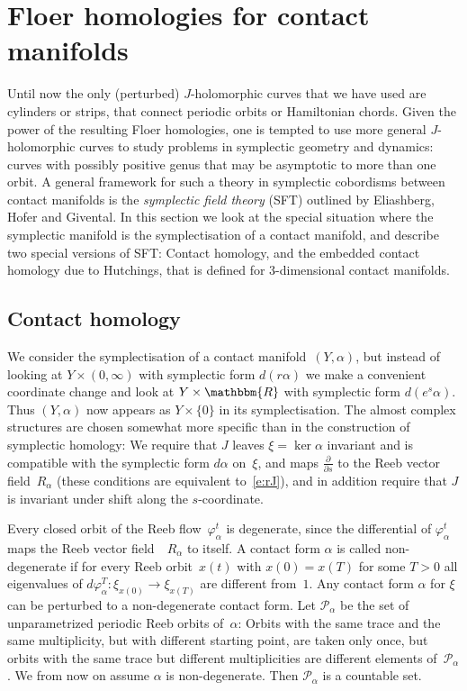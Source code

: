 \documentclass[12pt,twoside]{amsart}
\theoremstyle{plain}
\numberwithin{figure}{section}
\numberwithin{equation}{section}
\def\ga{\alpha}
\def\gf{\varphi}
\def\cp{{\mathcal P}}
\def\RR{\mathbbm{R}}
\def\pp{\partial}
\begin{document}



\section{Floer homologies for contact manifolds}
\label{s:contact}

Until now the only (perturbed) $J$-holomorphic curves that we have used
are cylinders or strips, that connect periodic orbits or Hamiltonian chords. 
Given the power of the resulting Floer homologies, one is tempted to use
more general $J$-holomorphic curves to study problems in symplectic geometry and dynamics:
curves with possibly positive genus that may be asymptotic to more than one orbit. 
A general framework for such a theory in symplectic cobordisms between contact manifolds
is the {\it symplectic field theory}\/ (SFT) outlined by
Eliashberg, Hofer and Givental.
%
In this section we look at the special situation where the symplectic manifold
is the symplectisation of a contact manifold,
and describe two special versions of SFT:
Contact homology, and the embedded contact homology due to Hutchings, 
that is defined for 3-dimensional contact manifolds.
 

\subsection{Contact homology} \label{s:ch}
              
We consider the symplectisation of a contact manifold~$(Y,\ga)$,
but instead of looking at $Y \times (0,\infty)$ with symplectic form $d(r \ga)$
we make a convenient coordinate change and look at
$Y \times \RR$ with symplectic form $d (e^s \ga)$. 
Thus $(Y,\ga)$ now appears as $Y \times \{0\}$ in its symplectisation.
The almost complex structures are chosen somewhat more specific than in the
construction of symplectic homology: 
We require that $J$ leaves $\xi = \ker \ga$
invariant and is compatible with the symplectic form $d\ga$ on~$\xi$,
and maps $\frac{\pp}{\pp s}$ to the Reeb vector field~$R_\ga$
(these conditions are equivalent to~\eqref{e:rJ}), 
and in addition require that $J$ is invariant under shift along the $s$-coordinate.

Every closed orbit of the Reeb flow~$\gf_\ga^t$ is degenerate, since 
the differential of $\gf_\ga^t$ maps the Reeb vector field~~$R_\ga$ to itself.
A contact form $\ga$ is called non-degenerate if for every Reeb orbit~$x(t)$  
with $x(0) = x(T)$ for some $T>0$ all eigenvalues of 
$d\gf_{\ga}^T \colon \xi_{x(0)} \to \xi_{x(T)}$ are different from~$1$.
Any contact form $\ga$ for $\xi$ can be perturbed to a non-degenerate contact form.
%
Let $\cp_\ga$ be the set of unparametrized periodic Reeb orbits of~$\ga$:
Orbits with the same trace and the same multiplicity, 
but with different starting point, are taken only once, 
but orbits with the same trace but different multiplicities are different elements of~$\cp_\ga$.
We from now on assume $\ga$ is non-degenerate. Then $\cp_\ga$ is a countable set.
\end{document}
